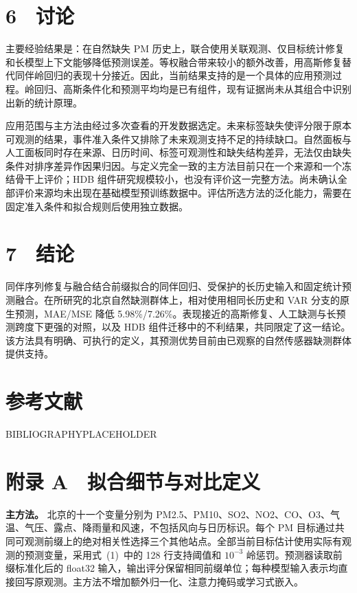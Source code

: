 \section{6　讨论}


主要经验结果是：在自然缺失 PM 历史上，联合使用关联观测、仅目标统计修复和长模型上下文能够降低预测误差。等权融合带来较小的额外改善，用高斯修复替代同伴岭回归的表现十分接近。因此，当前结果支持的是一个具体的应用预测过程。岭回归、高斯条件化和预测平均均是已有组件，现有证据尚未从其组合中识别出新的统计原理。

应用范围与主方法由经过多次查看的开发数据选定。未来标签缺失使评分限于原本可观测的结果，事件准入条件又排除了未来观测支持不足的持续缺口。自然面板与人工面板同时存在来源、日历时间、标签可观测性和缺失结构差异，无法仅由缺失条件对排序差异作因果归因。与定义完全一致的主方法目前只在一个来源和一个冻结骨干上评价；HDB 组件研究规模较小，也没有评价这一完整方法。尚未确认全部评价来源均未出现在基础模型预训练数据中。评估所选方法的泛化能力，需要在固定准入条件和拟合规则后使用独立数据。

\section{7　结论}


同伴序列修复与融合结合前缀拟合的同伴回归、受保护的长历史输入和固定统计预测融合。在所研究的北京自然缺测群体上，相对使用相同长历史和 VAR 分支的原生预测，MAE/MSE 降低 5.98\%/7.26\%。表现接近的高斯修复、人工缺测与长预测跨度下更强的对照，以及 HDB 组件迁移中的不利结果，共同限定了这一结论。该方法具有明确、可执行的定义，其预测优势目前由已观察的自然传感器缺测群体提供支持。

\section{参考文献}

BIBLIOGRAPHYPLACEHOLDER


\section{附录 A　拟合细节与对比定义}


\textbf{主方法。}
北京的十一个变量分别为 PM2.5、PM10、SO2、NO2、CO、O3、气温、气压、露点、降雨量和风速，不包括风向与日历标识。每个 PM 目标通过共同可观测前缀上的绝对相关性选择三个其他站点。全部当前目标估计使用实际有观测的预测变量，采用式~(1)~中的 128 行支持阈值和 $10^{-3}$ 岭惩罚。预测器读取前缀标准化后的 float32 输入，输出评分保留相同前缀单位；每种模型输入表示均直接回写原观测。主方法不增加额外归一化、注意力掩码或学习式嵌入。

